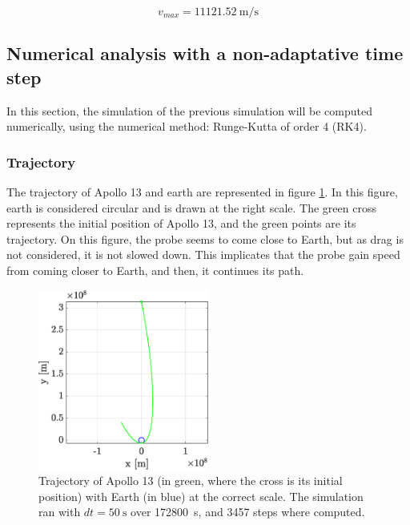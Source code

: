 \documentclass[a4paper,12pt,twoside]{article}
\begin{document}
\begin{equation}
  v_{max} = \SI{11121.52}{\meter\per\second} %
  \label{eq:1a-vitesse-max}
\end{equation}




\subsection{Numerical analysis with a non-adaptative time step}
In this section, the simulation of the previous simulation will be computed numerically, using the numerical method: Runge-Kutta of order 4 (RK4).

\subsubsection{Trajectory}\label{sec:1b_traj}
The trajectory of Apollo 13 and earth are represented in figure \ref{fig:1b_traj}.
In this figure, earth is considered circular and is drawn at the right scale.
The green cross represents the initial position of Apollo 13, and the green points are its trajectory.
On this figure, the probe seems to come close to Earth, but as drag is not considered, it is not slowed down.
This implicates that the probe gain speed from coming closer to Earth, and then, it continues its path.

\begin{figure}[h]
  \centering
  \includegraphics[width=0.5\textwidth]{graphs/ex1b_traj.eps}
  \caption{Trajectory of Apollo 13 (in green, where the cross is its initial position) with Earth (in blue) at the correct scale. The simulation ran with $dt=\SI{50}{\s}$ over \SI{172800}{\s}, and \num{3457} steps where computed.}
  \label{fig:1b_traj}
\end{figure}
\end{document}
